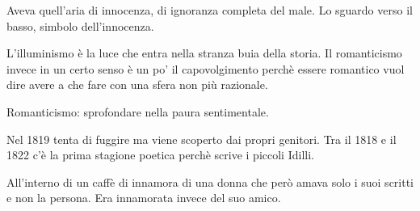 \documentclass{article}
\begin{document}
    Aveva quell'aria di innocenza, di ignoranza completa del male.
    Lo sguardo verso il basso, simbolo dell'innocenza.

    L'illuminismo è la luce che entra nella stranza buia della storia. Il romanticismo invece in un certo senso è un po' il capovolgimento perchè essere romantico vuol dire avere a che fare con una sfera non più razionale.

    Romanticismo: sprofondare nella paura sentimentale.

    Nel 1819 tenta di fuggire ma viene scoperto dai propri genitori. Tra il 1818 e il 1822 c'è la prima stagione poetica perchè scrive i piccoli Idilli.

    All'interno di un caffè di innamora di una donna che però amava solo i suoi scritti e non la persona. Era innamorata invece del suo amico.
\end{document}
